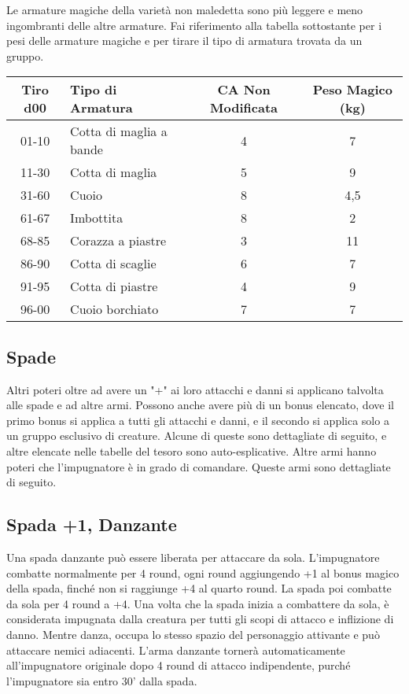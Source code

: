 \documentclass{article}
\begin{document}
\begin{multicols}{2}
Le armature magiche della varietà non maledetta sono più leggere e meno ingombranti delle altre armature. Fai riferimento alla tabella sottostante per i pesi delle armature magiche e per tirare il tipo di armatura trovata da un gruppo.

\begin{table}[h]
\centering
\begin{tabular}{|c|l|c|c|}
\hline
\textbf{Tiro d00} & \textbf{Tipo di Armatura} & \textbf{CA Non Modificata} & \textbf{Peso Magico (kg)} \\
\hline
01-10 & Cotta di maglia a bande & 4 & 7 \\
11-30 & Cotta di maglia & 5 & 9 \\
31-60 & Cuoio & 8 & 4,5 \\
61-67 & Imbottita & 8 & 2 \\
68-85 & Corazza a piastre & 3 & 11 \\
86-90 & Cotta di scaglie & 6 & 7 \\
91-95 & Cotta di piastre & 4 & 9 \\
96-00 & Cuoio borchiato & 7 & 7 \\
\hline
\end{tabular}

\end{table}

\subsection{Spade}
Altri poteri oltre ad avere un "+" ai loro attacchi e danni si applicano talvolta alle spade e ad altre armi. Possono anche avere più di un bonus elencato, dove il primo bonus si applica a tutti gli attacchi e danni, e il secondo si applica solo a un gruppo esclusivo di creature. Alcune di queste sono dettagliate di seguito, e altre elencate nelle tabelle del tesoro sono auto-esplicative. Altre armi hanno poteri che l'impugnatore è in grado di comandare. Queste armi sono dettagliate di seguito.

\subsection{Spada +1, Danzante}
Una spada danzante può essere liberata per attaccare da sola. L'impugnatore combatte normalmente per 4 round, ogni round aggiungendo +1 al bonus magico della spada, finché non si raggiunge +4 al quarto round. La spada poi combatte da sola per 4 round a +4. Una volta che la spada inizia a combattere da sola, è considerata impugnata dalla creatura per tutti gli scopi di attacco e inflizione di danno. Mentre danza, occupa lo stesso spazio del personaggio attivante e può attaccare nemici adiacenti. L'arma danzante tornerà automaticamente all'impugnatore originale dopo 4 round di attacco indipendente, purché l'impugnatore sia entro 30' dalla spada.


\end{multicols}
\end{document}
